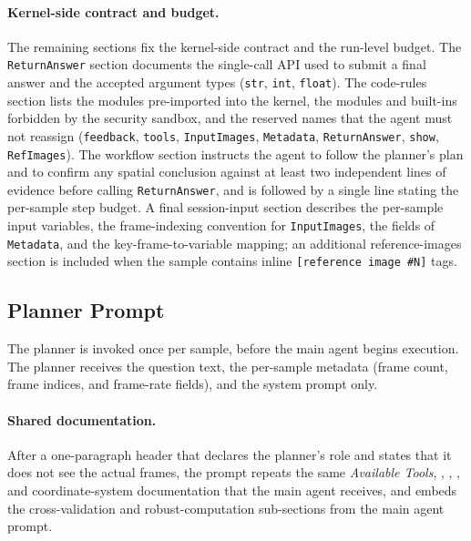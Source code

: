 \paragraph{Kernel-side contract and budget.}
The remaining sections fix the kernel-side contract and the run-level budget. The \texttt{ReturnAnswer} section documents the single-call API used to submit a final answer and the accepted argument types (\texttt{str}, \texttt{int}, \texttt{float}). The code-rules section lists the modules pre-imported into the kernel, the modules and built-ins forbidden by the security sandbox, and the reserved names that the agent must not reassign (\texttt{feedback}, \texttt{tools}, \texttt{InputImages}, \texttt{Metadata}, \texttt{ReturnAnswer}, \texttt{show}, \texttt{RefImages}). The workflow section instructs the agent to follow the planner's plan and to confirm any spatial conclusion against at least two independent lines of evidence before calling \texttt{ReturnAnswer}, and is followed by a single line stating the per-sample step budget. A final session-input section describes the per-sample input variables, the frame-indexing convention for \texttt{InputImages}, the fields of \texttt{Metadata}, and the key-frame-to-variable mapping; an additional reference-images section is included when the sample contains inline \texttt{[reference image \#N]} tags.

\subsection{Planner Prompt}
\label{app:prompt_planner}
The planner is invoked once per sample, before the main agent begins execution. The planner receives the question text, the per-sample metadata (frame count, frame indices, and frame-rate fields), and the system prompt only.

\paragraph{Shared documentation.}
After a one-paragraph header that declares the planner's role and states that it does not see the actual frames, the prompt repeats the same \emph{Available Tools}, , , , and coordinate-system documentation that the main agent receives, and embeds the cross-validation and robust-computation sub-sections from the main agent prompt.

